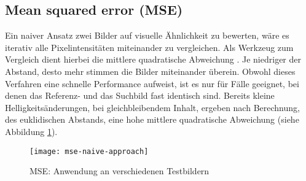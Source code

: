 \subsection{Mean squared error (MSE)}
Ein naiver Ansatz zwei Bilder auf visuelle Ähnlichkeit zu bewerten, wäre es
iterativ alle Pixelintensitäten miteinander zu vergleichen. Als Werkzeug zum
Vergleich dient hierbei die mittlere quadratische Abweichung
\parencite{mse-overview}. Je niedriger der Abstand, desto mehr stimmen die
Bilder miteinander überein. Obwohl dieses Verfahren eine schnelle Performance
aufweist, ist es nur für Fälle geeignet, bei denen das Referenz- und das 
Suchbild fast identisch sind. Bereits kleine Helligkeitsänderungen, bei
gleichbleibendem Inhalt, ergeben nach Berechnung, des euklidischen Abstands,
eine hohe mittlere quadratische Abweichung (siehe Abbildung
\ref{fig:mse-naive}). \parencite{mse-naive-approach}

\begin{figure}[H]
    \centering
    \texttt{[image: mse-naive-approach]}
    \caption{MSE: Anwendung an verschiedenen Testbildern}
    \label{fig:mse-naive}
\end{figure}